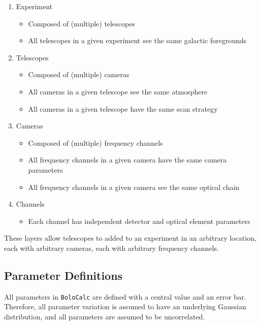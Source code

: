 \documentclass[11pt]{article} %
\begin{document}
\begin{enumerate}[noitemsep,topsep=0pt]
\item Experiment
\begin{itemize}[noitemsep,topsep=0pt]
	\item Composed of (multiple) telescopes
	\item All telescopes in a given experiment see the same galactic foregrounds
\end{itemize}
\item Telescopes
\begin{itemize}[noitemsep,topsep=0pt]
	\item Composed of (multiple) cameras
	\item All cameras in a given telescope see the same atmosphere
	\item All cameras in a given telescope have the same scan strategy 
\end{itemize}
\item Cameras
\begin{itemize}[noitemsep,topsep=0pt]
	\item Composed of (multiple) frequency channels
	\item All frequency channels in a given camera have the same camera parameters
	\item All frequency channels in a given camera see the same optical chain
\end{itemize}
\item Channels
\begin{itemize}[noitemsep,topsep=0pt]
	\item Each channel has independent detector and optical element parameters
\end{itemize}
\end{enumerate}

These layers allow telescopes to added to an experiment in an arbitrary location, each with arbitrary cameras, each with arbitrary frequency channels.


\subsection{Parameter Definitions}

All parameters in \texttt{BoloCalc} are defined with a central value and an error bar. Therefore, all parameter variation is assumed to have an underlying Gaussian distribution, and all parameters are assumed to be uncorrelated. 
\end{document}
